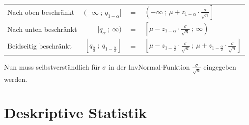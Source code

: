 \documentclass[twoside, a4paper]{report}
\begin{document}
\begin{center}
  \begin{tabular}{lrcl}
    \toprule
    Nach oben beschränkt & \((-\infty\ ;\ q_{1-\alpha}]\) & \(=\) & \(\left(-\infty\ ;\ \mu + z_{1-\alpha} \cdot \frac{\sigma}{\sqrt{n}}\right]\)\\[1em]
    Nach unten beschränkt & \([q_{\alpha}\ ;\ \infty)\) & \(=\) & \(\left[\mu - z_{1- \alpha} \cdot \frac{\sigma}{\sqrt{n}}\ ;\ \infty\right)\)\\[1em]
    Beidseitig beschränkt & \([q_{\frac{\alpha}{2}}\ ;\ q_{1-\frac{\alpha}{2}}]\) & \(=\) & \(\left[\mu - z_{1-\frac{\alpha}{2}} \cdot \frac{\sigma}{\sqrt{n}}\ ;\ \mu + z_{1-\frac{\alpha}{2}} \cdot \frac{\sigma}{\sqrt{n}}\right]\)\\[1em]
    \bottomrule
  \end{tabular}
\end{center}

Nun muss selbstverständlich für $\sigma$ in der InvNormal-Funktion \(\frac{\sigma}{\sqrt{n}}\) eingegeben werden.

\part{Deskriptive Statistik}
\end{document}
